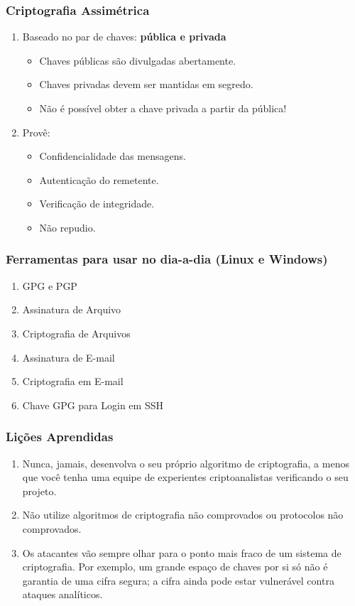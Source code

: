 \documentclass[compress]{beamer}
\begin{document}
\begin{frame}
\frametitle{Criptografia Assimétrica}
\begin{enumerate}
	\item<+->{Baseado no par de chaves: \textbf{pública e privada}}
	\begin{itemize}
		\item<+->{Chaves públicas são divulgadas abertamente.}
		\item<+->{Chaves privadas devem ser mantidas em segredo.}
		\item<+->{Não é possível obter a chave privada a partir da pública!}
	\end{itemize}
	\item<+->{Provê:}
	\begin{itemize}
		\item<+->{Confidencialidade das mensagens.}
		\item<+->{Autenticação do remetente.}
		\item<+->{Verificação de integridade.}
		\item<+->{Não repudio.}
	\end{itemize}
\end{enumerate}
\end{frame}


\begin{frame}
\frametitle{Ferramentas para usar no dia-a-dia (Linux e Windows)}
		\begin{enumerate}
			\item<+->{GPG e PGP}
			\item<+->{Assinatura de Arquivo}
			\item<+->{Criptografia de Arquivos}
			\item<+->{Assinatura de E-mail}
			\item<+->{Criptografia em E-mail}
			\item<+->{Chave GPG para Login em SSH}
		\end{enumerate}
\end{frame}

\begin{frame}
\frametitle{Lições Aprendidas}
\justifying
	\begin{enumerate}
		\item<+->{Nunca, jamais, desenvolva o seu próprio algoritmo de criptografia, a menos que você tenha uma equipe de experientes criptoanalistas verificando o seu projeto.}
		\item<+->{Não utilize algoritmos de criptografia não comprovados ou protocolos não comprovados.}
		\item<+->{Os atacantes vão sempre olhar para o ponto mais fraco de um sistema de criptografia. Por exemplo, um grande espaço de chaves por si só não é garantia de uma cifra segura; a cifra ainda pode estar vulnerável contra ataques analíticos.}
	\end{enumerate}
\end{frame}
\end{document}
